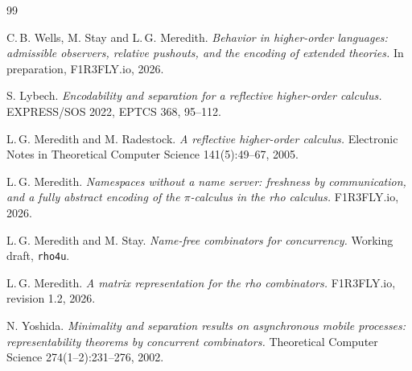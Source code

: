 \documentclass[11pt]{article}
\theoremstyle{plain}
\theoremstyle{definition}
\theoremstyle{remark}
\begin{document}
\begin{thebibliography}{99}

 C.\,B. Wells, M. Stay and L.\,G. Meredith.
\emph{Behavior in higher-order languages: admissible observers, relative
pushouts, and the encoding of extended theories.}
In preparation, F1R3FLY.io, 2026.

 S. Lybech.
\emph{Encodability and separation for a reflective higher-order calculus.}
EXPRESS/SOS 2022, EPTCS 368, 95--112.

 L.\,G. Meredith and M. Radestock.
\emph{A reflective higher-order calculus.}
Electronic Notes in Theoretical Computer Science 141(5):49--67, 2005.

 L.\,G. Meredith.
\emph{Namespaces without a name server: freshness by communication, and a
fully abstract encoding of the $\pi$-calculus in the rho calculus.}
F1R3FLY.io, 2026.

 L.\,G. Meredith and M. Stay.
\emph{Name-free combinators for concurrency.}
Working draft, \texttt{rho4u}.

 L.\,G. Meredith.
\emph{A matrix representation for the rho combinators.}
F1R3FLY.io, revision 1.2, 2026.

 N. Yoshida.
\emph{Minimality and separation results on asynchronous mobile processes:
representability theorems by concurrent combinators.}
Theoretical Computer Science 274(1--2):231--276, 2002.

\end{thebibliography}
\end{document}
